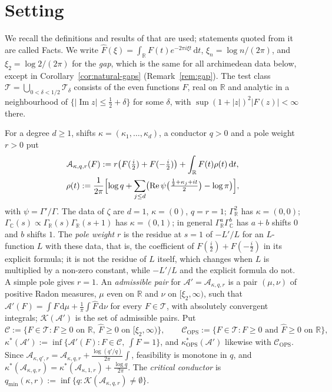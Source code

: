 \documentclass[11pt]{amsart}
\newcommand{\RR}{\mathbb R}
\newcommand{\dd}{\,\mathrm d}
\renewcommand{\Re}{\operatorname{Re}}
\renewcommand{\Im}{\operatorname{Im}}
\newcommand{\hF}{\widehat F}
\newcommand{\xin}[1]{\xi_{#1}}
\newcommand{\GR}{\Gamma_{\mathbb R}}
\newcommand{\GC}{\Gamma_{\mathbb C}}
\newcommand{\Arch}{\mathcal A}
\newcommand{\Tc}{\mathcal T}
\newcommand{\Kad}{\mathcal K}
\newcommand{\Cone}{\mathcal C}
\newcommand{\ConeOPS}{\mathcal C_{\mathrm{OPS}}}
\newcommand{\kstar}{\kappa^{*}}
\newcommand{\kOPS}{\kappa^{*}_{\mathrm{OPS}}}
\newcommand{\qmin}{q_{\min}}
\theoremstyle{definition}
\theoremstyle{remark}
\numberwithin{equation}{section}
\begin{document}
\section{Setting}\label{sec:setting}

We recall the definitions and results of \cite{PaperI} that are used; statements quoted from it are called Facts. We write
$\hF(\xi)=\int_\RR F(t)e^{-2\pi i\xi t}\dd t$, $\xin n=\log n/(2\pi)$, and $\xin2=\log2/(2\pi)$ for the \emph{gap}, which is the same
for all archimedean data below, except in Corollary~\ref{cor:natural-gaps} (Remark~\ref{rem:gap}). The test class
$\Tc=\bigcup_{0<\delta<1/2}\Tc_\delta$ consists of the even functions $F$, real on $\RR$ and analytic in a neighbourhood of
$\{\lvert\Im z\rvert\le\frac12+\delta\}$ for some $\delta$, with $\sup(1+\lvert z\rvert)^2\lvert F(z)\rvert<\infty$ there.

For a degree $d\ge1$, shifts $\kappa=(\kappa_1,\dots,\kappa_d)$, a conductor $q>0$ and a pole weight $r>0$ put
\begin{gather*}
\Arch_{\kappa,q,r}(F):=r\bigl(F(\tfrac i2)+F(-\tfrac i2)\bigr)+\int_\RR F(t)\rho(t)\dd t,\\
\rho(t):=\frac1{2\pi}\Bigl[\log q+\sum_{j\le d}\bigl(\Re\psi\bigl(\tfrac{\frac12+\kappa_j+it}{2}\bigr)-\log\pi\bigr)\Bigr],
\end{gather*}
with $\psi=\Gamma'/\Gamma$. The data of $\zeta$ are $d=1$, $\kappa=(0)$, $q=r=1$; $\GR^2$ has $\kappa=(0,0)$; $\GC(s)\propto\GR(s)\GR(s+1)$ has
$\kappa=(0,1)$; in general $\GR^a\GC^b$ has $a+b$ shifts $0$ and $b$ shifts $1$. The \emph{pole weight} $r$ is the residue at $s=1$ of
$-L'/L$ for an $L$-function $L$ with these data, that is, the coefficient of $F(\frac i2)+F(-\frac i2)$ in its explicit formula; it
is not the residue of $L$ itself, which changes when $L$ is multiplied by a non-zero constant, while $-L'/L$ and the explicit
formula do not. A simple pole gives $r=1$. An \emph{admissible pair} for $\Arch'=\Arch_{\kappa,q,r}$ is a
pair $(\mu,\nu)$ of positive Radon measures, $\mu$ even on $\RR$ and $\nu$ on $[\xin2,\infty)$, such that
$\Arch'(F)=\int F\dd\mu+\frac1\pi\int\hF\dd\nu$ for every $F\in\Tc$, with absolutely convergent integrals; $\Kad(\Arch')$ is the set of
admissible pairs. Put
\[
\Cone:=\{F\in\Tc:F\ge0\text{ on }\RR,\ \hF\ge0\text{ on }[\xin2,\infty)\},\qquad
\ConeOPS:=\{F\in\Tc:F\ge0\text{ and }\hF\ge0\text{ on }\RR\},
\]
$\kstar(\Arch'):=\inf\{\Arch'(F):F\in\Cone,\ \int F=1\}$, and $\kOPS(\Arch')$ likewise with $\ConeOPS$. Since
$\Arch_{\kappa,q',r}=\Arch_{\kappa,q,r}+\frac{\log(q'/q)}{2\pi}\int$, feasibility is monotone in $q$, and
$\kstar(\Arch_{\kappa,q,r})=\kstar(\Arch_{\kappa,1,r})+\frac{\log q}{2\pi}$. The \emph{critical conductor} is
$\qmin(\kappa,r):=\inf\{q:\Kad(\Arch_{\kappa,q,r})\ne\emptyset\}$.
\end{document}
